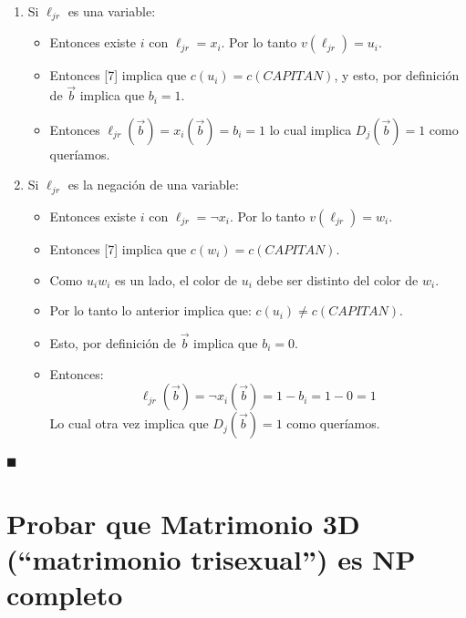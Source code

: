 \documentclass[11pt, a4paper]{article}
\theoremstyle{definition}
\begin{document}
\begin{enumerate}[label=\roman*.]
    \item Si $\ell_{jr}$ es una variable:
    \begin{itemize}
        \item Entonces existe $i$ con $\ell_{jr} = x_i$. Por lo tanto $v(\ell_{jr}) = u_i$.
        \item Entonces [7] implica que $c(u_i) = c(CAPITAN)$, y esto, por definición de $\vec{b}$ implica que $b_i = 1$.
        \item Entonces $\ell_{jr}(\vec{b}) = x_i(\vec{b}) = b_i = 1$ lo cual implica $D_j(\vec{b}) = 1$ como queríamos.
    \end{itemize}
    \item Si $\ell_{jr}$ es la negación de una variable:
    \begin{itemize}
        \item Entonces existe $i$ con $\ell_{jr} = \neg x_i$. Por lo tanto $v(\ell_{jr}) = w_i$.
        \item Entonces [7] implica que $c(w_i) = c(CAPITAN)$.
        \item Como $u_i w_i$ es un lado, el color de $u_i$ debe ser distinto del color de $w_i$.
        \item Por lo tanto lo anterior implica que: $c(u_i) \neq c(CAPITAN)$.
        \item Esto, por definición de $\vec{b}$ implica que $b_i = 0$.
        \item Entonces: 
                        \[
                            \ell_{jr}(\vec{b}) = \neg x_i(\vec{b}) = 1 - b_i = 1 - 0 = 1
                        \]
            Lo cual otra vez implica que $D_j(\vec{b}) = 1$ como queríamos.
    \end{itemize}
\end{enumerate}
\(\blacksquare\)
\section{Probar que Matrimonio 3D (“matrimonio trisexual”) es NP completo}
\end{document}
